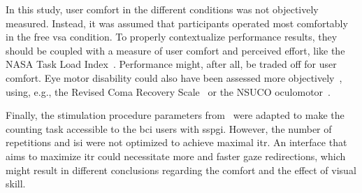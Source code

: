 In this study, user comfort in the different conditions was not objectively
measured.
Instead, it was assumed that participants operated most comfortably in the free
\ac{vsa} condition.
To properly contextualize performance results, they should be coupled
with a measure of user comfort and perceived effort, like the NASA Task Load
Index~\cite{Hart2006}.
Performance might, after all, be traded off for user comfort.
Eye motor disability could also have been assessed more
objectively~\cite{FriedOken2020}, using, e.g.,
the Revised Coma Recovery Scale~\cite{Giacino2004} or the NSUCO
oculomotor~\cite{Maples1992}.

Finally, the stimulation procedure parameters
from~\textcite{VanDenKerchove2024} were adapted to make the counting task
accessible to the \ac{bci} users with \ac{sspgi}.
However, the number of repetitions and \ac{isi} were not optimized to achieve
maximal \ac{itr}.
An interface that aims to maximize \ac{itr} could necessitate more and faster
gaze redirections, which might result in different conclusions regarding the
comfort and the effect of visual skill.
